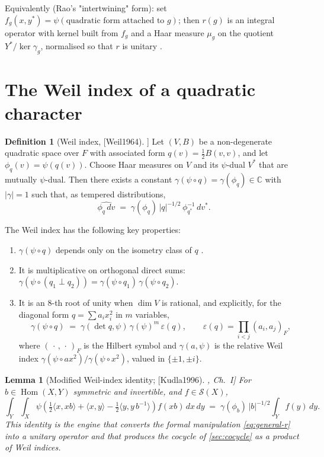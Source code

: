 \documentclass[11pt,letterpaper]{article}
\newcommand{\Hom}{\operatorname{Hom}}
\newcommand{\Schwartz}{\mathcal{S}}
\newcommand{\F}{F}
\newcommand{\C}{\mathbb{C}}
\newcommand{\inv}{^{-1}}
\theoremstyle{plain}
\newtheorem{lemma}[theorem]{Lemma}
\theoremstyle{definition}
\newtheorem{definition}[theorem]{Definition}
\begin{document}
Equivalently (Rao's "intertwining" form): set $f_g(x,y^*) = \psi(\text{quadratic form attached to } g)$; then $r(g)$ is an integral operator with kernel built from $f_g$ and a Haar measure $\mu_g$ on the quotient $Y^*/\ker\gamma_g$, normalised so that $r$ is unitary \cite[Thm.~3.5]{Rao1993}.

\section{The Weil index of a quadratic character}
\label{sec:weil-index}

\begin{definition}[Weil index, [Weil1964]]
Let $(V,B)$ be a non-degenerate quadratic space over $\F$ with associated form $q(v) = \tfrac{1}{2}B(v,v)$, and let $\phi_q(v) = \psi(q(v))$. Choose Haar measures on $V$ and its $\psi$-dual $V^*$ that are mutually $\psi$-dual. Then there exists a constant $\gamma(\psi\circ q) = \gamma(\phi_q) \in \C$ with $|\gamma|=1$ such that, as tempered distributions,
\[
\widehat{\phi_q\,dv} \;=\; \gamma(\phi_q)\,|q|^{-1/2}\,\phi_{q^*}^{-1}\,dv^*.
\]
\end{definition}

The Weil index has the following key properties:
\begin{enumerate}[leftmargin=2em,itemsep=2pt]
  \item $\gamma(\psi\circ q)$ depends only on the isometry class of $q$ \cite[\S 14]{Weil1964}.
  \item It is multiplicative on orthogonal direct sums: $\gamma(\psi\circ(q_1 \perp q_2)) = \gamma(\psi\circ q_1)\,\gamma(\psi\circ q_2)$.
  \item It is an $8$-th root of unity when $\dim V$ is rational, and explicitly, for the diagonal form $q = \sum a_i x_i^2$ in $m$ variables,
  \begin{equation}\label{eq:gamma-diag}
    \gamma(\psi\circ q) \;=\; \gamma(\det q,\psi)\,\gamma(\psi)^m\,\varepsilon(q),
    \qquad \varepsilon(q) = \prod_{i<j}(a_i,a_j)_\F,
  \end{equation}
  where $(\,\cdot\,,\,\cdot\,)_\F$ is the Hilbert symbol and $\gamma(a,\psi)$ is the relative Weil index $\gamma(\psi\circ ax^2)/\gamma(\psi\circ x^2)$, valued in $\{\pm 1, \pm i\}$.
\end{enumerate}

\begin{lemma}[Modified Weil-index identity; [Kudla1996], Ch.~I]
For $b \in \Hom(X,Y)$ symmetric and invertible, and $f \in \Schwartz(X)$,
\[
\int_Y\!\!\int_X
\psi\!\left(
  \tfrac{1}{2}\langle x,xb\rangle
  + \langle x,y\rangle
  - \tfrac{1}{2}\langle y,y\,b\inv\rangle
\right)
f(xb)\,dx\,dy
\;=\; \gamma(\phi_b)\,|b|^{-1/2}\!\int_Y f(y)\,dy.
\]
This identity is the engine that converts the formal manipulation \cref{eq:general-r} into a unitary operator and that produces the cocycle of \cref{sec:cocycle} as a product of Weil indices.
\end{lemma}
\end{document}
